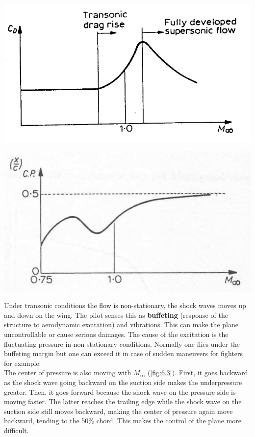 \documentclass[british,french,11pt, a4paper, openany]{article}
\begin{document}
\begin{center}
	\begin{minipage}{0.3\textwidth}
		\includegraphics[scale=0.15]{ch6/2}
		\label{fig:6.2}
	\end{minipage}
	\begin{minipage}{0.3\textwidth}
		\includegraphics[scale=0.15]{ch6/3}
		\label{fig:6.3}
	\end{minipage}
\end{center}

Under transonic conditions the flow is non-stationary, the shock waves moves up and down on the wing. The pilot senses this as \textbf{buffeting} (response of the structure to aerodynamic excitation) and vibrations. This can make the plane uncontrollable or cause serious damages. The cause of the excitation is the fluctuating pressure in non-stationary conditions. Normally one flies under the buffeting margin but one can exceed it in case of sudden maneuvers for fighters for example. \\

The center of pressure is also moving with $M_\infty$ (\autoref{fig:6.3}). First, it goes backward as the shock wave going backward on the suction side makes the underpressure greater. Then, it goes forward because the shock wave on the pressure side is moving faster. The latter reaches the trailing edge while the shock wave on the suction side still moves backward, making the center of pressure again move backward, tending to the 50\% chord. This makes the control of the plane more difficult. \\
\end{document}
